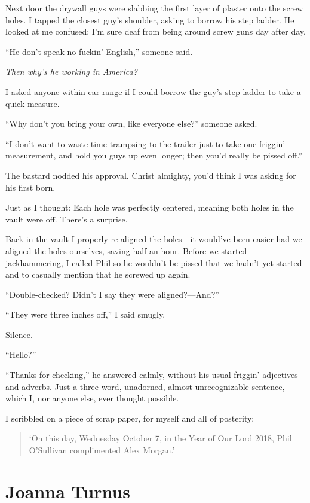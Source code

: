 Next door the drywall guys were slabbing the first layer of plaster onto
the screw holes. I tapped the closest guy's shoulder, asking to borrow
his step ladder. He looked at me confused; I'm sure deaf from being
around screw guns day after day.

``He don't speak no fuckin' English,'' someone said.

\emph{Then why's he working in America?}

I asked anyone within ear range if I could borrow the guy's step ladder
to take a quick measure.

``Why don't you bring your own, like everyone else?'' someone asked.

``I don't want to waste time trampsing to the trailer just to take one
friggin' measurement, and hold you guys up even longer; then you'd
really be pissed off.''

The bastard nodded his approval. Christ almighty, you'd think I was
asking for his first born.

Just as I thought: Each hole was perfectly centered, meaning both holes
in the vault were off. There's a surprise.

Back in the vault I properly re-aligned the holes---it would've been
easier had we aligned the holes ourselves, saving half an hour. Before
we started jackhammering, I called Phil so he wouldn't be pissed that we
hadn't yet started and to casually mention that he screwed up again.

``Double-checked? Didn't I say they were aligned?---And?''

``They were three inches off,'' I said smugly.

Silence.

``Hello?''

``Thanks for checking,'' he answered calmly, without his usual friggin'
adjectives and adverbs. Just a three-word, unadorned, almost
unrecognizable sentence, which I, nor anyone else, ever thought
possible.

I scribbled on a piece of scrap paper, for myself and all of posterity:

\begin{quote}
`On this day, Wednesday October 7, in the Year of Our Lord 2018, Phil
O'Sullivan complimented Alex Morgan.'
\end{quote}

\chapter{Joanna Turnus}

